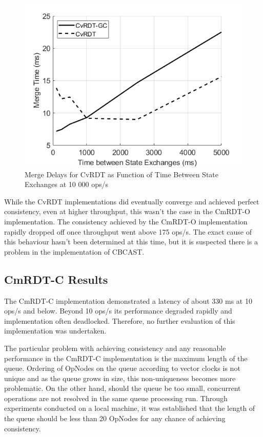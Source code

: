 \documentclass[sigconf,nonacm,10pt]{acmart}
\begin{document}
\begin{figure}[h]
  \centering
  \includegraphics[width=\linewidth]{Fig9CvRDTMerge3}
  \caption{Merge Delays for CvRDT as Function of Time Between State Exchanges at 10 000 ops/s}
  \label{fig:eval3}
\end{figure}

While the CvRDT implementations did eventually converge and achieved perfect consistency, even at higher throughput, this wasn't the case in the CmRDT-O implementation. The consistency achieved by the CmRDT-O implementation rapidly dropped off once throughput went above 175 ops/s. The exact cause of this behaviour hasn't been determined at this time, but it is suspected there is a problem in the implementation of CBCAST.

\subsection{CmRDT-C Results}
The CmRDT-C implementation demonstrated a latency of about 330 ms at 10 ops/s and below. Beyond 10 ops/s its performance degraded rapidly and implementation often deadlocked. Therefore, no further evaluation of this implementation was undertaken.

The particular problem with achieving consistency and any reasonable performance in the CmRDT-C implementation is the maximum length of the queue. Ordering of OpNodes on the queue according to vector clocks is not unique and as the queue grows in size, this non-uniqueness becomes more problematic. On the other hand, should the queue be too small, concurrent operations are not resolved in the same queue processing run. Through experiments conducted on a local machine, it was established that the length of the queue should be less than 20 OpNodes for any chance of achieving consistency.
\end{document}
